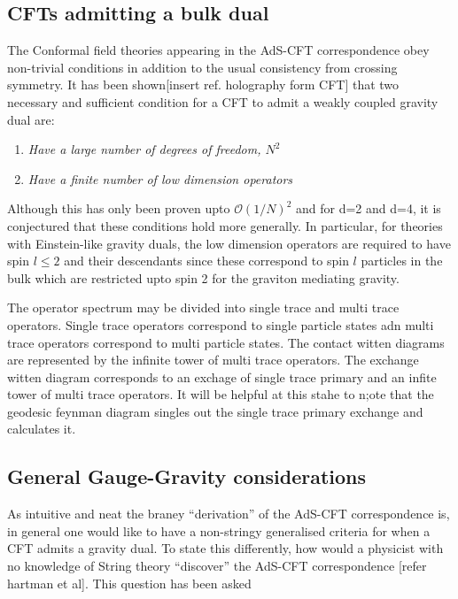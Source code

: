  
 \subsection{CFTs admitting a bulk dual}
 The Conformal field theories appearing in the AdS-CFT correspondence obey non-trivial conditions in addition to the usual consistency from crossing symmetry. It has been shown[insert ref. holography form CFT] that two necessary and sufficient condition for a CFT to admit a weakly coupled gravity dual are:
 \begin{enumerate}
  \item \emph{Have a large number of degrees of freedom, $N^2$}
  \item \emph{Have a finite number of low dimension operators}
 \end{enumerate}
  Although this has only been proven upto $\mathcal{O}(1/N)^2$ and for d=2 and d=4, it is conjectured that these conditions hold more generally. In particular, for theories with Einstein-like gravity duals, the low dimension operators are required to have spin $l \leq 2$ and their descendants since these correspond to spin $l$ particles in the bulk which are restricted upto spin 2 for the graviton mediating gravity.
  
  The operator spectrum may be divided into single trace and multi trace operators. Single trace operators correspond to single particle states adn multi trace operators correspond to multi particle states. The contact witten diagrams are represented by the infinite tower of multi trace operators. The exchange witten diagram corresponds to an exchage of single trace primary and an infite tower of multi trace operators. It will be helpful at this stahe to n;ote that the geodesic feynman diagram singles out the single trace primary exchange and calculates  it.
 \subsection{General Gauge-Gravity considerations}
 As intuitive and neat the braney ``derivation'' of the AdS-CFT correspondence is, in general one would like to have a non-stringy generalised criteria for when a CFT admits a gravity dual. To state this differently, how would a physicist with no knowledge of String theory ``discover'' the AdS-CFT correspondence [refer hartman et al]. This question has been asked 
